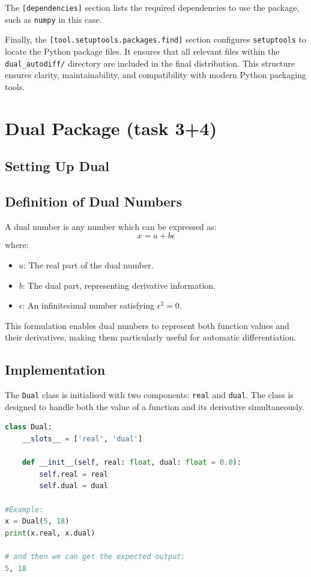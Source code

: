 \documentclass[12.5pt]{article}
\begin{document}
The \texttt{[dependencies]} section lists the required dependencies to use the package, such as \texttt{numpy} in this case.

Finally, the \texttt{[tool.setuptools.packages.find]} section configures \texttt{setuptools} to locate the Python package files. It ensures that all relevant files within the \texttt{dual\_autodiff/} directory are included in the final distribution. This structure ensures clarity, maintainability, and compatibility with modern Python packaging tools.

\newpage
\section{Dual Package (task 3+4)}
\subsection{Setting Up Dual}

\subsection*{Definition of Dual Numbers}
A dual number \cite{dualdef} is any number which can be expressed as:
\[
x = a + b\epsilon
\]
where:
\begin{itemize}
    \item \( a \): The real part of the dual number.
    \item \( b \): The dual part, representing derivative information.
    \item \( \epsilon \): An infinitesimal number satisfying \( \epsilon^2 = 0 \).
\end{itemize}

This formulation enables dual numbers to represent both function values and their derivatives, making them particularly useful for automatic differentiation.

\subsection*{Implementation}\label{2.1}

The \texttt{Dual} class is initialised with two components: \texttt{real} and \texttt{dual}. The class is designed to handle both the value of a function and its derivative simultaneously.

\begin{lstlisting}[language=Python]
class Dual:
    __slots__ = ['real', 'dual']

    def __init__(self, real: float, dual: float = 0.0):
        self.real = real
        self.dual = dual
        
#Example: 
x = Dual(5, 18)
print(x.real, x.dual)

# and then we can get the expected output:
5, 18
\end{lstlisting}
\end{document}
